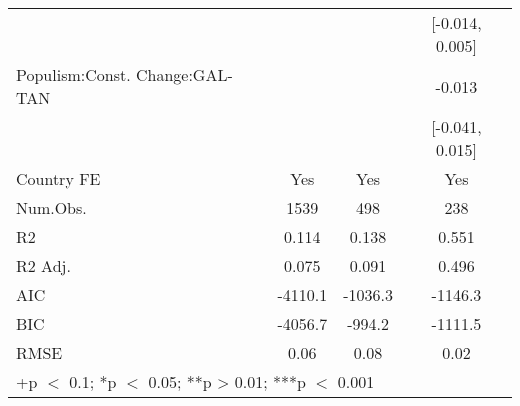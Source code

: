 \begin{table}
\begin{tabular}[t]{lccc}
 &  &  & {}[-0.014, 0.005]\\
Populism:Const. Change:GAL-TAN &  &  & -0.013\\
 &  &  & {}[-0.041, 0.015]\\
\midrule
Country FE & Yes & Yes & Yes\\
Num.Obs. & 1539 & 498 & 238\\
R2 & 0.114 & 0.138 & 0.551\\
R2 Adj. & 0.075 & 0.091 & 0.496\\
AIC & -4110.1 & -1036.3 & -1146.3\\
BIC & -4056.7 & -994.2 & -1111.5\\
RMSE & 0.06 & 0.08 & 0.02\\
\bottomrule
\multicolumn{4}{l}{\rule{0pt}{1em}+p $<$ 0.1; *p $<$ 0.05; **p > 0.01; ***p $<$ 0.001}\\
\end{tabular}
\end{table}
